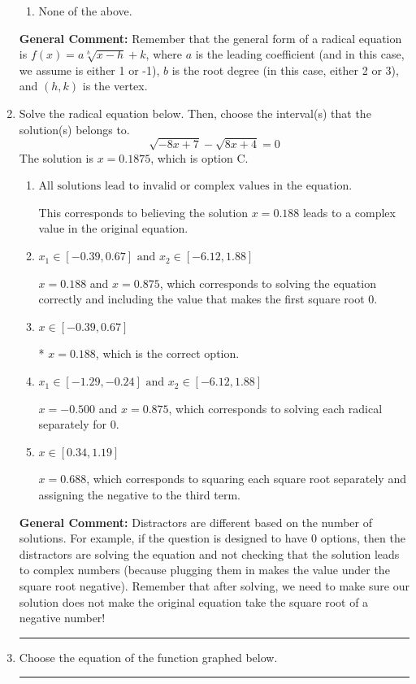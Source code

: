 \documentclass{extbook}[14pt]
\newcommand{\litem}[1]{\item #1

\rule{\textwidth}{0.4pt}}
\begin{document}
\begin{enumerate}
{\begin{enumerate}[label=\Alph*.]
\begin{multicols}{2}
\end{multicols}\item None of the above.\end{enumerate}
\textbf{General Comment:} Remember that the general form of a radical equation is $ f(x) = a \sqrt[b]{x - h} + k $, where $a$ is the leading coefficient (and in this case, we assume is either 1 or -1), $b$ is the root degree (in this case, either 2 or 3), and $(h, k)$ is the vertex.
}
\litem{
Solve the radical equation below. Then, choose the interval(s) that the solution(s) belongs to.
\[ \sqrt{-8 x + 7} - \sqrt{8 x + 4} = 0 \]
The solution is \( x = 0.1875 \), which is option C.\begin{enumerate}[label=\Alph*.]
\item \( \text{All solutions lead to invalid or complex values in the equation.} \)

This corresponds to believing the solution $x = 0.188$ leads to a complex value in the original equation.
\item \( x_1 \in [-0.39, 0.67] \text{ and } x_2 \in [-6.12,1.88] \)

$x = 0.188$ and $x = 0.875$, which corresponds to solving the equation correctly and including the value that makes the first square root 0.
\item \( x \in [-0.39,0.67] \)

* $x = 0.188$, which is the correct option.
\item \( x_1 \in [-1.29, -0.24] \text{ and } x_2 \in [-6.12,1.88] \)

$x = -0.500$ and $x = 0.875$, which corresponds to solving each radical separately for 0.
\item \( x \in [0.34,1.19] \)

$x = 0.688$, which corresponds to squaring each square root separately and assigning the negative to the third term.
\end{enumerate}

\textbf{General Comment:} Distractors are different based on the number of solutions. For example, if the question is designed to have 0 options, then the distractors are solving the equation and not checking that the solution leads to complex numbers (because plugging them in makes the value under the square root negative). Remember that after solving, we need to make sure our solution does not make the original equation take the square root of a negative number!
}
\litem{
Choose the equation of the function graphed below.

}
\end{enumerate}
\end{document}
